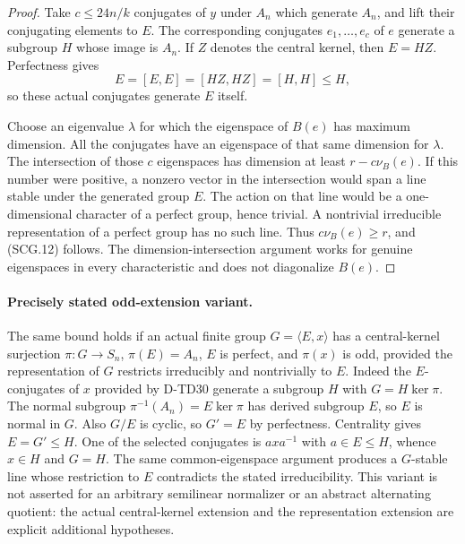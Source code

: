 \begin{proof}
Take $c\le24n/k$ conjugates of $y$ under $A_n$ which generate
$A_n$, and lift their conjugating elements to $E$. The corresponding
conjugates $e_1,\ldots,e_c$ of $e$ generate a subgroup $H$ whose
image is $A_n$. If $Z$ denotes the central kernel, then $E=HZ$.
Perfectness gives
\[
                  E=[E,E]=[HZ,HZ]=[H,H]\le H,
                  \tag{SCG.13}
\]
so these actual conjugates generate $E$ itself.

Choose an eigenvalue $\lambda$ for which the eigenspace of $B(e)$
has maximum dimension. All the conjugates have an eigenspace of
that same dimension for $\lambda$. The intersection of those
$c$ eigenspaces has dimension at least $r-c\nu_B(e)$.
If this number were positive, a nonzero vector in the intersection
would span a line stable under the generated group $E$.
The action on that line would be a one-dimensional character of
a perfect group, hence trivial. A nontrivial irreducible
representation of a perfect group has no such line. Thus
$c\nu_B(e)\ge r$, and (SCG.12) follows.
The dimension-intersection argument works for genuine eigenspaces
in every characteristic and does not diagonalize $B(e)$.
\end{proof}

\paragraph{Precisely stated odd-extension variant.}
The same bound holds if an actual finite group $G=\langle E,x\rangle$
has a central-kernel surjection $\pi:G\longrightarrow S_n$,
$\pi(E)=A_n$, $E$ is perfect, and $\pi(x)$ is odd, provided the
representation of $G$ restricts irreducibly and nontrivially to $E$.
Indeed the $E$-conjugates of $x$ provided by D-TD30 generate a
subgroup $H$ with $G=H\ker\pi$. The normal subgroup
$\pi^{-1}(A_n)=E\ker\pi$ has derived subgroup $E$, so $E$
is normal in $G$. Also $G/E$ is cyclic, so
$G'=E$ by perfectness. Centrality gives $E=G'\le H$.
One of the selected conjugates is $a x a^{-1}$ with $a\in E\le H$,
whence $x\in H$ and $G=H$. The same common-eigenspace argument
produces a $G$-stable line whose restriction to $E$ contradicts
the stated irreducibility. This variant is not asserted for an
arbitrary semilinear normalizer or an abstract alternating quotient:
the actual central-kernel extension and the representation extension
are explicit additional hypotheses.

